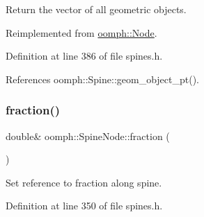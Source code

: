Return the vector of all geometric objects. 



Reimplemented from \hyperlink{classoomph_1_1Node_a2e05b79b6b3249e3ebd9096a550c93b6}{oomph\+::\+Node}.



Definition at line 386 of file spines.\+h.



References oomph\+::\+Spine\+::geom\+\_\+object\+\_\+pt().

\mbox{\label{classoomph_1_1SpineNode_aea50ab25f54e35d2121b090ae7b0c313}} 
\subsubsection{\texorpdfstring{fraction()}{fraction()}}
{\footnotesize\ttfamily double\& oomph\+::\+Spine\+Node\+::fraction (\begin{DoxyParamCaption}{ }\end{DoxyParamCaption})\hspace{0.3cm}{\ttfamily [inline]}}



Set reference to fraction along spine. 



Definition at line 350 of file spines.\+h.



